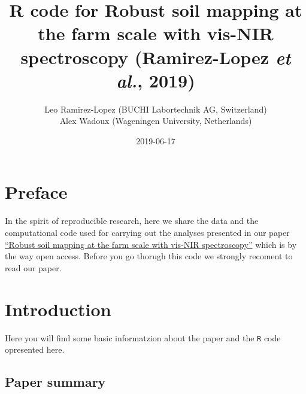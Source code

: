 \documentclass[]{book}
\title{R code for Robust soil mapping at the farm scale with vis-NIR spectroscopy (Ramirez-Lopez \emph{et al.}, 2019)}
\author{Leo Ramirez-Lopez (BUCHI Labortechnik AG, Switzerland) \\ Alex Wadoux (Wageningen University, Netherlands)}
\date{2019-06-17}
\begin{document}
\maketitle

{
\setcounter{tocdepth}{1}
\tableofcontents
}
\hypertarget{preface}{%
\chapter*{Preface}\label{preface}}

In the spirit of reproducible research, here we share the data and the computational code
used for carrying out the analyses presented in our paper \href{https://onlinelibrary.wiley.com/doi/10.1111/ejss.12752}{``Robust soil mapping at the farm scale with vis-NIR spectroscopy''} which is by the way open access. Before you go thorugh this code we strongly recoment to read our paper.

\hypertarget{intro}{%
\chapter{Introduction}\label{intro}}

Here you will find some basic informatzion about the paper and the \texttt{R} code opresented here.

\hypertarget{paper-summary}{%
\section{Paper summary}\label{paper-summary}}
\end{document}
